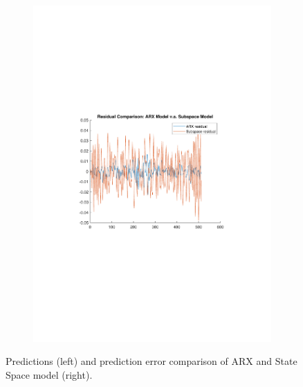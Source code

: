 \documentclass[]{article}
\begin{document}
\begin{figure}[ht]
\begin{subfigure}{.49\textwidth}
	\includegraphics[trim= 10cm 8cm 10cm 8cm, scale=0.4]{figures/pred_diff_arx_ss.pdf}
\end{subfigure}
\caption{Predictions (left) and prediction error comparison of ARX and State Space model (right).}
\label{fig:predictions}
\end{figure}
\end{document}
